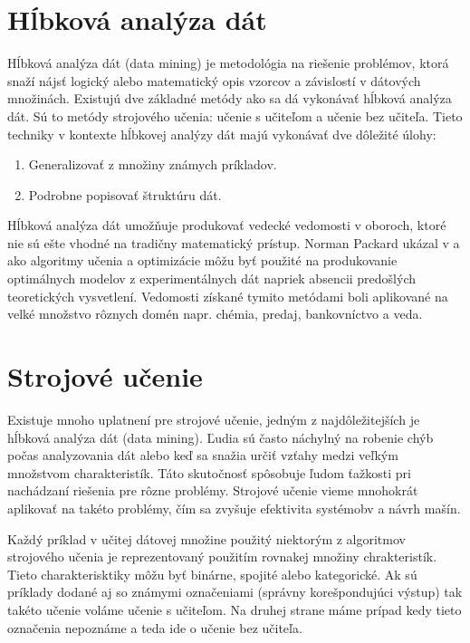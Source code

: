 \section{Hĺbková analýza dát}
Hĺbková analýza dát (data mining) je metodológia na riešenie problémov, ktorá snaží nájsť logický alebo matematický opis vzorcov a závislostí v dátových množinách. Existujú dve základné metódy ako sa dá vykonávať hĺbková analýza dát. Sú to metódy strojového učenia: učenie s učiteľom a učenie bez učiteľa. Tieto techniky v kontexte hĺbkovej analýzy dát majú vykonávať dve dôležité úlohy:
\begin{enumerate}
  \item Generalizovať z množiny známych príkladov.
  \item Podrobne popisovať štruktúru dát.
\end{enumerate}
\par Hĺbková analýza dát umožňuje produkovať vedecké vedomosti v oboroch, ktoré nie sú ešte vhodné na tradičny matematický prístup. Norman Packard ukázal v \cite{6} a \cite{7} ako algoritmy učenia a optimizácie môžu byť použité na produkovanie optimálnych modelov z experimentálnych dát napriek absencii predošlých teoretických vysvetlení. Vedomosti získané tymito metódami boli aplikované na velké množstvo rôznych domén napr. chémia, predaj, bankovníctvo a veda.
\section{Strojové učenie}
Existuje mnoho uplatnení pre strojové učenie, jedným z najdôležitejších je hĺbková analýza dát (data mining). Ľudia sú často náchylný na robenie chýb počas analyzovania dát alebo keď sa snažia určiť vzťahy medzi veľkým množstvom charakteristík. Táto skutočnosť spôsobuje ľudom ťažkosti pri nachádzaní riešenia pre rôzne problémy. Strojové učenie vieme mnohokrát aplikovať na takéto problémy, čím sa zvyšuje efektivita systémobv a návrh mašín.\par
Každý príklad v učitej dátovej množine použitý niektorým z algoritmov strojového učenia je reprezentovaný použitím rovnakej množiny chrakteristík. Tieto charakterisktiky môžu byť binárne, spojité alebo kategorické. Ak sú príklady dodané aj so známymi označeniami (správny korešpondujúci výstup) tak takéto učenie voláme učenie s učiteľom. Na druhej strane máme prípad kedy tieto označenia nepoznáme a teda ide o učenie bez učiteľa.

